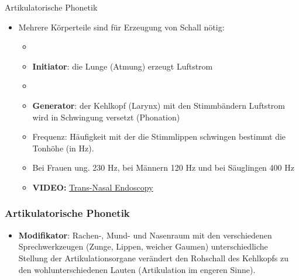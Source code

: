 \begin{frame}{Artikulatorische Phonetik}

	\begin{itemize}
		\item Mehrere Körperteile sind für Erzeugung von Schall nötig:
		
		\begin{itemize}
			\item[]
			\item \textbf{Initiator}: die Lunge \ras (Atmung) erzeugt Luftstrom
			\item[]
			\item \textbf{Generator}: der Kehlkopf (Larynx) mit den Stimmbändern \ras Luftstrom wird in Schwingung versetzt (Phonation)
		\end{itemize}
		
		\begin{itemize}
			\item[] Frequenz: Häufigkeit mit der die Stimmlippen schwingen bestimmt die Tonhöhe (in Hz).
			\item[]

			\ea Bei Frauen ung. 230 Hz, bei Männern 120 Hz und bei Säuglingen 400 Hz
			\z

		\end{itemize}
		
		\begin{itemize}
			\item[] \textbf{VIDEO:} \href{run:material/04TransNasalEndoscopy.mp4}{Trans-Nasal Endoscopy}
		\end{itemize}
		
	\end{itemize}
	
\end{frame}



\begin{frame}
\frametitle{Artikulatorische Phonetik}

	\begin{itemize}
		\item \textbf{Modifikator}: Rachen-, Mund- und Nasenraum mit den verschiedenen Sprechwerkzeugen (Zunge, Lippen, weicher Gaumen) \ras unterschiedliche Stellung der Artikulationsorgane verändert den Rohschall des Kehlkopfs zu den wohlunterschiedenen Lauten (Artikulation im engeren Sinne).
	\end{itemize}
	
\end{frame}



